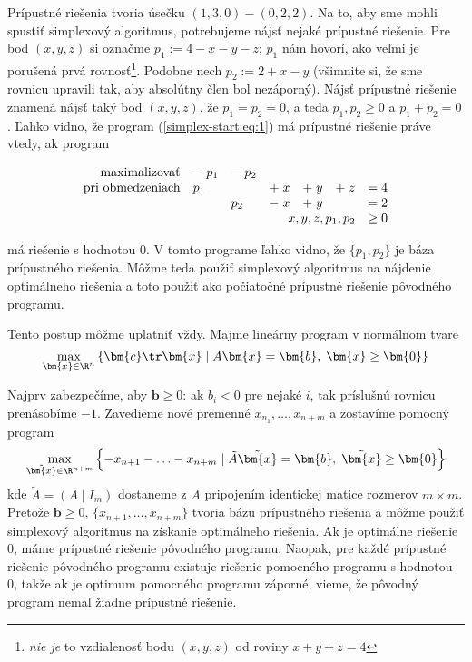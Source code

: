 \vskip 2mm
\noindent
Prípustné riešenia tvoria úsečku $(1,3,0) - (0,2,2)$. 
Na to, aby sme mohli spustiť simplexový algoritmus, potrebujeme nájsť nejaké prípustné riešenie.
Pre bod $(x,y,z)$ si označme $p_1:=4-x-y-z$; $p_1$ nám hovorí, ako veľmi je porušená
prvá rovnosť\footnote{{\em nie je } to vzdialenosť bodu $(x,y,z)$ od roviny $x+y+z=4$}. Podobne
nech $p_2:=2+x-y$ (všimnite si, že sme rovnicu upravili tak, aby absolútny člen bol nezáporný). 
Nájsť prípustné riešenie znamená nájsť taký bod $(x,y,z)$, že $p_1=p_2=0$,
a teda $p_1,p_2\ge0$ a $p_1+p_2=0$. Ľahko vidno, že program (\ref{simplex-start:eq:1}) má prípustné
riešenie práve vtedy, ak program


\begin{equation}
  \label{simplex-start:eq:2}
  \begin{array}{rllllll}
    \text{maximalizovať}& -\;p_1 & -\;p_2 & \\
    \text{pri obmedzeniach}& p_1 & &+\;x & +\;y & +\;z & =4\\
                           & & p_2 & -\;x& +\;y & & = 2\\
\multicolumn{6}{r}{x,y,z,p_1,p_2}&\ge 0
 

  \end{array}
\end{equation}

\noindent
má riešenie s hodnotou $0$.
V tomto programe ľahko vidno, že $\{p_1,p_2\}$ je báza prípustného riešenia. Môžme teda použiť simplexový algoritmus na nájdenie optimálneho riešenia
a toto použiť ako počiatočné prípustné riešenie pôvodného programu.

\noindent
Tento postup môžme uplatniť vždy. Majme lineárny program v normálnom tvare
$$ \max_{\bm{x}\in\R^n}\left\{ \bm{c}\tr\bm{x} \mid A\bm{x}=\bm{b},\;\bm{x}\ge\bm{0}\right\}$$


\noindent
Najprv zabezpečíme, aby $\bm{b}\ge0$: ak $b_i<0$ pre nejaké $i$, tak príslušnú rovnicu prenásobíme $-1$.
Zavedieme nové premenné $x_{n_1},\ldots,x_{n+m}$ a zostavíme pomocný program
$$ \max_{\tilde{\bm{x}}\in\R^{n+m}}\left\{ -x_{n+1}-\ldots-x_{n+m} \mid \tilde{A}\tilde{\bm{x}}=\bm{b},\;\tilde{\bm{x}}\ge\bm{0}\right\}$$
kde $\tilde{A}=(A\mid I_m)$ dostaneme z $A$ pripojením identickej matice rozmerov $m\times m$.
Pretože $\bm{b}\ge0$, $\{x_{n+1},\ldots,x_{n+m}\}$ tvoria bázu prípustného riešenia a môžme použiť simplexový algoritmus na získanie optimálneho riešenia.
Ak je optimálne riešenie 0, máme prípustné riešenie pôvodného programu. Naopak, pre každé prípustné riešenie pôvodného programu 
existuje riešenie pomocného programu s hodnotou 0, takže ak je optimum pomocného programu záporné, vieme, že pôvodný program
nemal žiadne prípustné riešenie.

